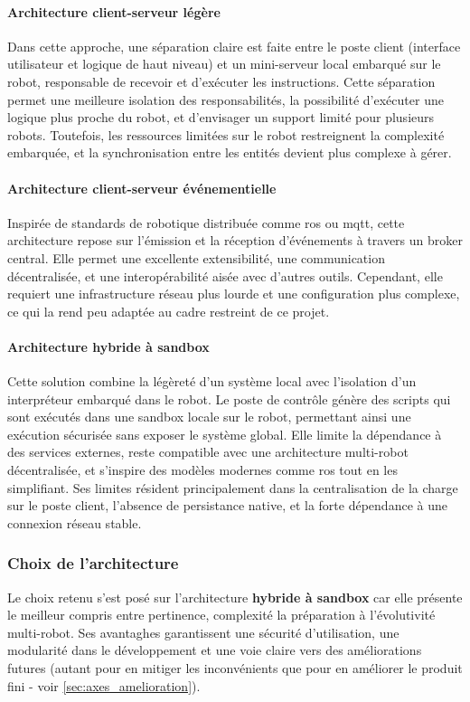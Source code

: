 \paragraph{Architecture client-serveur légère}
Dans cette approche, une séparation claire est faite entre le poste client (interface utilisateur et logique de haut niveau) et un mini-serveur local embarqué sur le robot, responsable de recevoir et d’exécuter les instructions.  
Cette séparation permet une meilleure isolation des responsabilités, la possibilité d’exécuter une logique plus proche du robot, et d’envisager un support limité pour plusieurs robots.  
Toutefois, les ressources limitées sur le robot restreignent la complexité embarquée, et la synchronisation entre les entités devient plus complexe à gérer.

\paragraph{Architecture client-serveur événementielle}
Inspirée de standards de robotique distribuée comme \acrshort{ros} ou \acrshort{mqtt}, cette architecture repose sur l’émission et la réception d’événements à travers un broker central.  
Elle permet une excellente extensibilité, une communication décentralisée, et une interopérabilité aisée avec d’autres outils.  
Cependant, elle requiert une infrastructure réseau plus lourde et une configuration plus complexe, ce qui la rend peu adaptée au cadre restreint de ce projet.

\paragraph{Architecture hybride à sandbox}
Cette solution combine la légèreté d’un système local avec l’isolation d’un interpréteur embarqué dans le robot.  
Le poste de contrôle génère des scripts qui sont exécutés dans une sandbox locale sur le robot, permettant ainsi une exécution sécurisée sans exposer le système global.  
Elle limite la dépendance à des services externes, reste compatible avec une architecture multi-robot décentralisée, et s’inspire des modèles modernes comme \acrshort{ros} tout en les simplifiant.  
Ses limites résident principalement dans la centralisation de la charge sur le poste client, l’absence de persistance native, et la forte dépendance à une connexion réseau stable.

\subsubsection{Choix de l'architecture}
Le choix retenu s'est posé sur l'architecture \textbf{hybride à sandbox} car elle présente le meilleur compris entre pertinence, complexité la préparation à l'évolutivité multi-robot.
Ses avantaghes garantissent une sécurité d'utilisation, une modularité dans le développement et une voie claire vers des améliorations futures (autant pour en mitiger les inconvénients que pour en améliorer le produit fini - voir \autoref{sec:axes_amelioration}).

